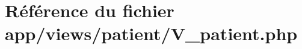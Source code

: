 \hypertarget{_v__patient_8php}{}\section{Référence du fichier app/views/patient/\+V\+\_\+patient.php}
\label{_v__patient_8php}
